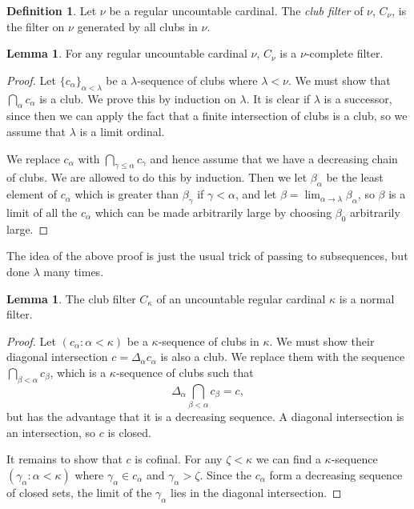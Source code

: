 \documentclass[12pt]{report}
\newcommand{\dfn}[1]{\emph{#1}\index{#1}}
\theoremstyle{definition}
\newtheorem{lemma}[theorem]{Lemma}
\newtheorem{definition}[theorem]{Definition}
\begin{document}
\begin{definition}
Let $\nu$ be a regular uncountable cardinal. The \dfn{club filter} of $\nu$, $C_\nu$, is the filter on $\nu$ generated by all clubs in $\nu$.
\end{definition}
\begin{lemma}
For any regular uncountable cardinal $\nu$, $C_\nu$ is a $\nu$-complete filter.
\end{lemma}
\begin{proof}
Let $\{c_\alpha\}_{\alpha < \lambda}$ be a $\lambda$-sequence of clubs where $\lambda < \nu$. We must show that $\bigcap_\alpha c_\alpha$ is a club.
We prove this by induction on $\lambda$. It is clear if $\lambda$ is a successor, since then we can apply the fact that a finite intersection of clubs is a club, so we assume that $\lambda$ is a limit ordinal.

We replace $c_\alpha$ with $\bigcap_{\gamma \leq \alpha} c_\gamma$ and hence assume that we have a decreasing chain of clubs. We are allowed to do this by induction.
Then we let $\beta_\alpha$ be the least element of $c_\alpha$ which is greater than $\beta_\gamma$ if $\gamma < \alpha$, and let $\beta = \lim_{\alpha \to \lambda} \beta_\alpha$, so $\beta$ is a limit of all the $c_\alpha$ which can be made arbitrarily large by choosing $\beta_0$ arbitrarily large.
\end{proof}
The idea of the above proof is just the usual trick of passing to subsequences, but done $\lambda$ many times.

\begin{lemma}
The club filter $C_\kappa$ of an uncountable regular cardinal $\kappa$ is a normal filter.
\end{lemma}
\begin{proof}
Let $(c_\alpha: \alpha < \kappa)$ be a $\kappa$-sequence of clubs in $\kappa$.
We must show their diagonal intersection $c = \Delta_\alpha c_\alpha$ is also a club.
We replace them with the sequence $\bigcap_{\beta < \alpha} c_\beta$, which is a $\kappa$-sequence of clubs such that
$$\Delta_\alpha \bigcap_{\beta < \alpha} c_\beta = c,$$
but has the advantage that it is a decreasing sequence.
A diagonal intersection is an intersection, so $c$ is closed.

It remains to show that $c$ is cofinal. For any $\zeta < \kappa$ we can find a $\kappa$-sequence $(\gamma_\alpha: \alpha < \kappa)$ where $\gamma_\alpha \in c_\alpha$ and $\gamma_\alpha > \zeta$.
Since the $c_\alpha$ form a decreasing sequence of closed sets, the limit of the $\gamma_\alpha$ lies in the diagonal intersection.
\end{proof}
\end{document}

